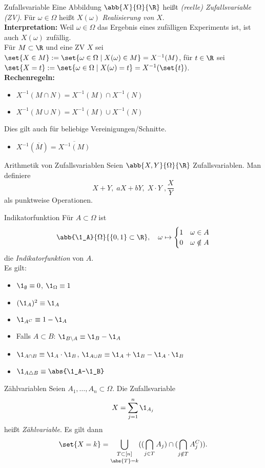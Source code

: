\begin{karte}{Zufallsvariable}
	Eine Abbildung $\abb{X}{\Omega}{\R}$ heißt \textit{(reelle) Zufallsvariable (ZV)}. Für $\omega \in \Omega$ heißt $X(\omega)$ \textit{Realisierung von} $X$. \\
	\textbf{Interpretation:} Weil $\omega \in\Omega$ das Ergebnis eines zufälligen Experiments ist, ist auch $X(\omega)$ \glqq zufällig\grqq. \\
	Für $M \subset \R$ und eine ZV $X$ sei $\set{X \in M} := \set{\omega  \in \Omega \;|\; X(\omega) \in M} = X^{-1}(M)$, für $t \in \R$ sei $\set{X = t} := \set{\omega \in \Omega \;|\; X(\omega) = t} = X^{-1}(\set{t})$. \\
	\textbf{Rechenregeln:}
	\begin{itemize}
		\item $X^{-1}(M \cap N) = X^{-1}(M) \cap X^{-1}(N)$
		\item $X^{-1}(M \cup N) = X^{-1}(M) \cup X^{-1}(N)$
	\end{itemize}
	Dies gilt auch für beliebige Vereinigungen/Schnitte.
	\begin{itemize}
		\item $X^{-1}(\overline{M}) = \overline{X^{-1}(M)}$
	\end{itemize}
\end{karte}

\begin{karte}{Arithmetik von Zufallsvariablen}
	Seien $\abb{X,Y}{\Omega}{\R}$ Zufallsvariablen. Man definiere 
	$$X+Y,\; aX+bY,\; X\cdot Y\; ,\frac{X}{Y}$$ als punktweise Operationen.
\end{karte}

\begin{karte}{Indikatorfunktion}
	Für $A \subset \Omega$ ist
	$$\abb{\1_A}{\Omega}{\{0,1\} \subset\R}, \quad \omega \mapsto
	\begin{cases}
	1 & \omega \in A \\
	0 & \omega \notin A
	\end{cases}$$
	die \textit{Indikatorfunktion} von $A$. \\
	Es gilt:
	\begin{itemize}
		\item $\1_{\emptyset} \equiv 0$, \quad $\1_{\Omega} \equiv 1$
		\item $(\1_A)^2 \equiv \1_A$
		\item $\1_{A^C} \equiv 1-\1_A$
		\item Falls $A\subset B$: $\1_{B \setminus A} \equiv \1_B - \1_A$
		\item $\1_{A \cap B} \equiv \1_A \cdot \1_B$, \quad $\1_{A \cup B} \equiv \1_A + \1_B - \1_A \cdot \1_B$
		\item $\1_{A \triangle B} \equiv \abs{\1_A-\1_B}$
	\end{itemize}
\end{karte} 

\begin{karte}{Zählvariablen}
	Seien $A_1,\dotsc,A_n \subset \Omega$. Die Zufallsvariable 
	$$ X = \sum_{j=1}^{n} \1_{A_j}$$ 
	heißt \textit{Zählvariable}. Es gilt dann
	$$ \set{X=k}=\mathop{\bigcup_{T \subset [n]}}_{\abs{T}=k}((\bigcap_{j \in T} A_j) \cap (\bigcap_{j \notin T} A_j^C)).$$
\end{karte}